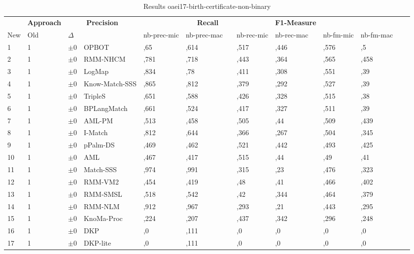 \begin{table}[htb]
\setlength{\tabcolsep}{0.5em}
\centering
\scriptsize
\begin{tabular}[tb]{lllp{2.3cm}llllllllll}
\noalign{\smallskip}\hline\noalign{\smallskip}
\multicolumn{3}{c}{\textbf{Rank}}& \textbf{Approach}  & \multicolumn{2}{c}{\textbf{Precision}}  & \hspace*{1mm}  & \multicolumn{2}{c}{\textbf{Recall}}  & \hspace*{1mm}  & \multicolumn{2}{c}{\textbf{F1-Measure}}  & \hspace*{1mm} \\
New & Old & $\Delta$ & &nb-prec-mic & nb-prec-mac && nb-rec-mic & nb-rec-mac && nb-fm-mic & nb-fm-mac\\
\noalign{\smallskip}\hline\noalign{\smallskip}
1 & 1 		& $\pm$0 &OPBOT    	&	,65 & ,614 & & ,517 & ,446 & & ,576 & ,5\\
2 & 1 		& $\pm$0 &RMM-NHCM    	&	,781 & ,718 & & ,443 & ,364 & & ,565 & ,458\\
3 & 1 		& $\pm$0 &LogMap    	&	,834 & ,78 & & ,411 & ,308 & & ,551 & ,39\\
4 & 1 		& $\pm$0 &Know-Match-SSS    	&	,865 & ,812 & & ,379 & ,292 & & ,527 & ,39\\
5 & 1 		& $\pm$0 &TripleS    	&	,651 & ,588 & & ,426 & ,328 & & ,515 & ,38\\
6 & 1 		& $\pm$0 &BPLangMatch    	&	,661 & ,524 & & ,417 & ,327 & & ,511 & ,39\\
7 & 1 		& $\pm$0 &AML-PM    	&	,513 & ,458 & & ,505 & ,44 & & ,509 & ,439\\
8 & 1 		& $\pm$0 &I-Match    	&	,812 & ,644 & & ,366 & ,267 & & ,504 & ,345\\
9 & 1 		& $\pm$0 &pPalm-DS    	&	,469 & ,462 & & ,521 & ,442 & & ,493 & ,425\\
10 & 1 		& $\pm$0 &AML    	&	,467 & ,417 & & ,515 & ,44 & & ,49 & ,41\\
11 & 1 		& $\pm$0 &Match-SSS    	&	,974 & ,991 & & ,315 & ,23 & & ,476 & ,323\\
12 & 1 		& $\pm$0 &RMM-VM2    	&	,454 & ,419 & & ,48 & ,41 & & ,466 & ,402\\
13 & 1 		& $\pm$0 &RMM-SMSL    	&	,518 & ,542 & & ,42 & ,344 & & ,464 & ,379\\
14 & 1 		& $\pm$0 &RMM-NLM    	&	,912 & ,967 & & ,293 & ,21 & & ,443 & ,295\\
15 & 1 		& $\pm$0 &KnoMa-Proc    	&	,224 & ,207 & & ,437 & ,342 & & ,296 & ,248\\
16 & 1 		& $\pm$0 &DKP    	&	,0 & ,111 & & ,0 & ,0 & & ,0 & ,0\\
17 & 1 		& $\pm$0 &DKP-lite    	&	,0 & ,111 & & ,0 & ,0 & & ,0 & ,0\\
\end{tabular}
\caption{Results oaei17-birth-certificate-non-binary}
\label{tbl:results}
\end{table}